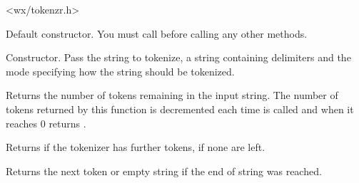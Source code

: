 




<wx/tokenzr.h>



\label{wxstringtokenizerwxstringtokenizer}


Default constructor. You must call 
 before calling any other
methods.


Constructor. Pass the string to tokenize, a string containing delimiters
and the mode specifying how the string should be tokenized.


\label{wxstringtokenizercounttokens}


Returns the number of tokens remaining in the input string. The number of
tokens returned by this function is decremented each time 
 is called and when it
reaches $0$  returns
\false.


\label{wxstringtokenizerhasmoretokens}


Returns \true if the tokenizer has further tokens, \false if none are left.


\label{wxstringtokenizergetnexttoken}


Returns the next token or empty string if the end of string was reached.


\label{wxstringtokenizergetposition}


